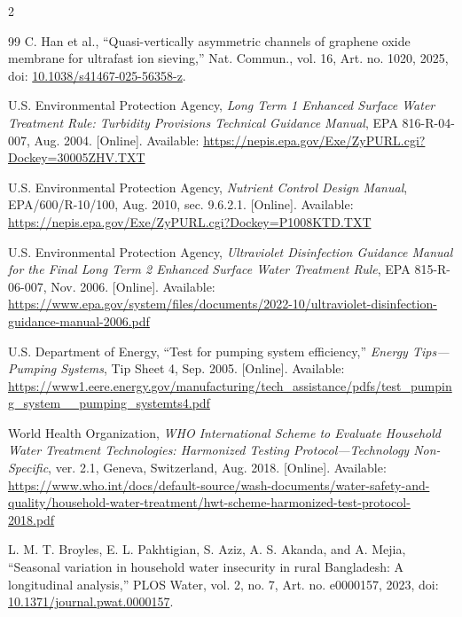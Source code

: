 \documentclass{ieeeaccess}
\begin{document}
\begin{multicols}{2}
\begin{thebibliography}{99}
 C. Han et al., ``Quasi-vertically asymmetric channels of graphene oxide membrane for ultrafast ion sieving,'' Nat. Commun., vol. 16, Art. no. 1020, 2025, doi: \href{https://doi.org/10.1038/s41467-025-56358-z}{10.1038/s41467-025-56358-z}.

 U.S. Environmental Protection Agency, \emph{Long Term 1 Enhanced Surface Water Treatment Rule: Turbidity Provisions Technical Guidance Manual}, EPA 816-R-04-007, Aug. 2004. [Online]. Available: \url{https://nepis.epa.gov/Exe/ZyPURL.cgi?Dockey=30005ZHV.TXT}

 U.S. Environmental Protection Agency, \emph{Nutrient Control Design Manual}, EPA/600/R-10/100, Aug. 2010, sec. 9.6.2.1. [Online]. Available: \url{https://nepis.epa.gov/Exe/ZyPURL.cgi?Dockey=P1008KTD.TXT}

 U.S. Environmental Protection Agency, \emph{Ultraviolet Disinfection Guidance Manual for the Final Long Term 2 Enhanced Surface Water Treatment Rule}, EPA 815-R-06-007, Nov. 2006. [Online]. Available: \url{https://www.epa.gov/system/files/documents/2022-10/ultraviolet-disinfection-guidance-manual-2006.pdf}

 U.S. Department of Energy, ``Test for pumping system efficiency,'' \emph{Energy Tips---Pumping Systems}, Tip Sheet 4, Sep. 2005. [Online]. Available: \url{https://www1.eere.energy.gov/manufacturing/tech_assistance/pdfs/test_pumping_system__pumping_systemts4.pdf}

 World Health Organization, \emph{WHO International Scheme to Evaluate Household Water Treatment Technologies: Harmonized Testing Protocol---Technology Non-Specific}, ver. 2.1, Geneva, Switzerland, Aug. 2018. [Online]. Available: \url{https://www.who.int/docs/default-source/wash-documents/water-safety-and-quality/household-water-treatment/hwt-scheme-harmonized-test-protocol-2018.pdf}

 L. M. T. Broyles, E. L. Pakhtigian, S. Aziz, A. S. Akanda, and A. Mejia, ``Seasonal variation in household water insecurity in rural Bangladesh: A longitudinal analysis,'' PLOS Water, vol. 2, no. 7, Art. no. e0000157, 2023, doi: \href{https://doi.org/10.1371/journal.pwat.0000157}{10.1371/journal.pwat.0000157}.
\end{thebibliography}

\end{multicols}
\end{document}
